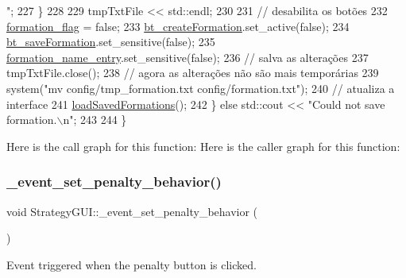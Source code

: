 \begin{DoxyCode}
{      "};
227         \}
228 
229         tmpTxtFile << std::endl;
230 
231         \textcolor{comment}{// desabilita os botões}
232         \hyperlink{class_strategy_g_u_i_aaac145125516fb8b7fe7137db18cdb58}{formation\_flag} = \textcolor{keyword}{false};
233         \hyperlink{class_strategy_g_u_i_ab6edc11fb98709c98ad1815998aa937a}{bt\_createFormation}.set\_active(\textcolor{keyword}{false});
234         \hyperlink{class_strategy_g_u_i_ae68d7475f55a82e46d74eb8b3cd53b9e}{bt\_saveFormation}.set\_sensitive(\textcolor{keyword}{false});
235         \hyperlink{class_strategy_g_u_i_a19406b76eaf73c06545aa1c67c0636ce}{formation\_name\_entry}.set\_sensitive(\textcolor{keyword}{false});
236         \textcolor{comment}{// salva as alterações}
237         tmpTxtFile.close();
238         \textcolor{comment}{// agora as alterações não são mais temporárias}
239         system(\textcolor{stringliteral}{"mv config/tmp\_formation.txt config/formation.txt"});
240         \textcolor{comment}{// atualiza a interface}
241         \hyperlink{class_strategy_g_u_i_a616a0f321878532cf85cfd02564758b5}{loadSavedFormations}();
242     \} \textcolor{keywordflow}{else} std::cout << \textcolor{stringliteral}{"Could not save formation.\(\backslash\)n"};
243 
244 \}
\end{DoxyCode}
Here is the call graph for this function\+:
Here is the caller graph for this function\+:
\mbox{\label{class_strategy_g_u_i_ab0aaf8ef6a664c6391c6fa0d6de40861}} 
\subsubsection{\texorpdfstring{\+\_\+event\+\_\+set\+\_\+penalty\+\_\+behavior()}{\_event\_set\_penalty\_behavior()}}
{\footnotesize\ttfamily void Strategy\+G\+U\+I\+::\+\_\+event\+\_\+set\+\_\+penalty\+\_\+behavior (\begin{DoxyParamCaption}{ }\end{DoxyParamCaption})\hspace{0.3cm}{\ttfamily [private]}}



Event triggered when the \textquotesingle{}penalty\textquotesingle{} button is clicked. 

